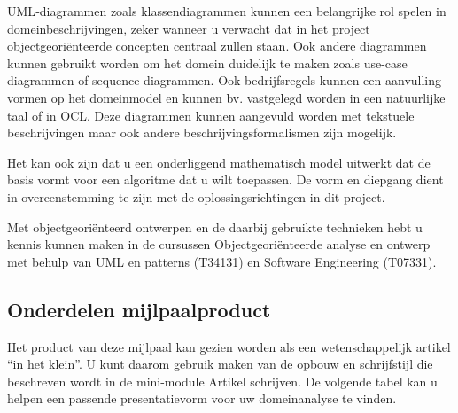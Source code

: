 UML‐diagrammen zoals klassendiagrammen kunnen een belangrijke rol spelen in
domeinbeschrijvingen, zeker wanneer u verwacht dat in het project
objectgeoriënteerde concepten centraal zullen staan. Ook andere diagrammen
kunnen gebruikt worden om het domein duidelijk te maken zoals use-case
diagrammen of sequence diagrammen. Ook bedrijfsregels kunnen een aanvulling
vormen op het domeinmodel en kunnen bv. vastgelegd worden in een natuurlijke
taal of in OCL. Deze diagrammen kunnen aangevuld worden met tekstuele
beschrijvingen maar ook andere beschrijvingsformalismen zijn mogelijk.

Het kan ook zijn dat u een onderliggend mathematisch model uitwerkt dat de basis
vormt voor een algoritme dat u wilt toepassen. De vorm en diepgang dient in
overeenstemming te zijn met de oplossingsrichtingen in dit project.

Met objectgeoriënteerd ontwerpen en de daarbij gebruikte technieken hebt u
kennis kunnen maken in de cursussen Objectgeoriënteerde analyse en ontwerp met
behulp van UML en patterns (T34131) en Software Engineering (T07331).

\subsection{Onderdelen mijlpaalproduct}

Het product van deze mijlpaal kan gezien worden als een wetenschappelijk artikel
``in het klein''. U kunt daarom gebruik maken van de opbouw en schrijfstijl
die beschreven wordt in de mini-module Artikel schrijven. De volgende tabel
kan u helpen een passende presentatievorm voor uw domeinanalyse te vinden.

